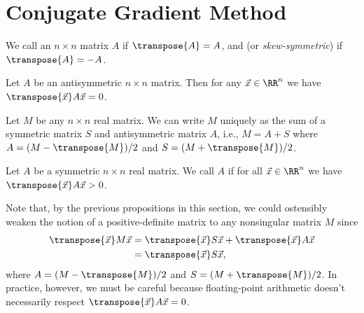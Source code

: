 \section{Conjugate Gradient Method}

\begin{definition}
We call an $n\times n$ matrix $A$  if $\transpose{A}=A$,
and  (or \emph{skew-symmetric}) if $\transpose{A}=-A$.
\end{definition}

\begin{prop}
Let $A$ be an antisymmetric $n\times n$ matrix. Then for any
$\vec{x}\in\RR^{n}$ we have $\transpose{\vec{x}}A\vec{x}=0$.
\end{prop}

\begin{prop}
Let $M$ be any $n\times n$ real matrix. We can write $M$ uniquely as the
sum of a symmetric matrix $S$ and antisymmetric matrix $A$, i.e.,
$M=A+S$ where $A=(M-\transpose{M})/2$ and $S=(M+\transpose{M})/2$.
\end{prop}

\begin{definition}
Let $A$ be a symmetric $n\times n$ real matrix. We call $A$
 if for all $\vec{x}\in\RR^{n}$ we have $\transpose{\vec{x}}A\vec{x}>0$.
\end{definition}

\begin{rmk}
Note that, by the previous propositions in this section, we could
ostensibly weaken the notion of a positive-definite matrix to any
nonsingular matrix $M$ since
\begin{equation}
  \begin{split}
\transpose{\vec{x}}M\vec{x}&=\transpose{\vec{x}}S\vec{x}+\transpose{\vec{x}}A\vec{x}\\
&=\transpose{\vec{x}}S\vec{x},
  \end{split}
\end{equation}
where $A=(M-\transpose{M})/2$ and $S=(M+\transpose{M})/2$.
In practice, however, we must be careful because floating-point arithmetic
doesn't necessarily respect $\transpose{\vec{x}}A\vec{x}=0$.
\end{rmk}


